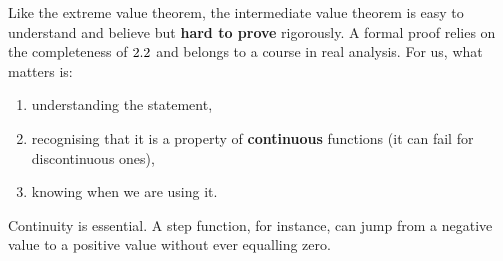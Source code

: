 \begin{remark}
Like the extreme value theorem, the intermediate value theorem is easy to understand and believe but \textbf{hard to prove} rigorously.  A formal proof relies on the completeness of $2.2$ and belongs to a course in real analysis.  For us, what matters is:
\begin{enumerate}[label=(\roman*)]
  \item understanding the statement,
  \item recognising that it is a property of \textbf{continuous} functions (it can fail for discontinuous ones),
  \item knowing when we are using it.
\end{enumerate}
\end{remark}

\begin{remark}[Warning]
Continuity is essential.  A step function, for instance, can jump from a negative value to a positive value without ever equalling zero.
\end{remark}
